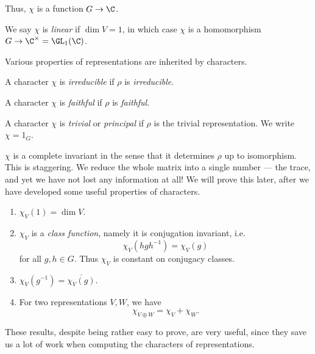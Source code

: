 \documentclass[a4paper]{article}
\begin{document}
Thus, $\chi$ is a function $G \to \C$.
\begin{defi}
  We say $\chi$ is \emph{linear} if $\dim V = 1$, in which case $\chi$ is a homomorphism $G \to \C^\times = \GL_1(\C)$.
\end{defi}

Various properties of representations are inherited by characters.
\begin{defi}
  A character $\chi$ is \emph{irreducible} if $\rho$ is \emph{irreducible}.
\end{defi}

\begin{defi}
  A character $\chi$ is \emph{faithful} if $\rho$ is \emph{faithful}.
\end{defi}

\begin{defi}
  A character $\chi$ is \emph{trivial} or \emph{principal} if $\rho$ is the trivial representation. We write $\chi = 1_G$.
\end{defi}

$\chi$ is a complete invariant in the sense that it determines $\rho$ up to isomorphism. This is staggering. We reduce the whole matrix into a single number --- the trace, and yet we have not lost any information at all! We will prove this later, after we have developed some useful properties of characters.

\begin{thm}\leavevmode
  \begin{enumerate}
    \item $\chi_V(1) = \dim V$.
    \item $\chi_V$ is a \emph{class function}, namely it is conjugation invariant, i.e.
      \[
        \chi_V(hgh^{-1}) = \chi_V(g)
      \]
      for all $g, h \in G$. Thus $\chi_V$ is constant on conjugacy classes.
    \item $\chi_V(g^{-1}) = \overline{\chi_V(g)}$.
    \item For two representations $V, W$, we have
      \[
        \chi_{V \oplus W} = \chi_V + \chi_W.
      \]
  \end{enumerate}
\end{thm}
These results, despite being rather easy to prove, are very useful, since they save us a lot of work when computing the characters of representations.
\end{document}
